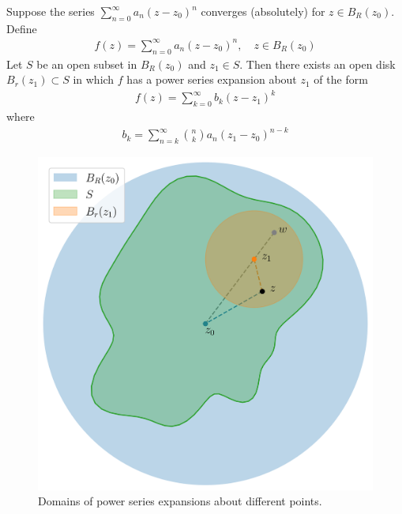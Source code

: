 \documentclass[thmcnt=section, 12pt]{my-elegantbook}
\begin{document}
\begin{theorem} \label{thm:63}
    Suppose the series $\sum_{n=0}^\infty a_n (z - z_0)^n$ converges (absolutely) for $z \in B_R(z_0)$. Define
    \begin{align*}
        f(z) = \sum_{n=0}^\infty a_n (z - z_0)^n,
        \quad z \in B_R(z_0)
    \end{align*}
    Let $S$ be an open subset in $B_R(z_0)$ and $z_1 \in S$. Then there exists an open disk $B_r(z_1) \subset S$ in which $f$ has a power series expansion about $z_1$ of the form
    \begin{align*}
        f(z) = \sum_{k=0}^\infty b_k (z - z_1)^k
    \end{align*}
    where 
    \begin{align*}
        b_k = \sum_{n=k}^\infty \binom{n}{k} a_n (z_1 - z_0)^{n-k}
    \end{align*}
\end{theorem}

\begin{figure}[ht]
    \centering
    \includegraphics[scale=0.4]{figures/domain-001.png}
    \caption{Domains of power series expansions about different points.}
    \label{fig:13}
\end{figure}
\end{document}
